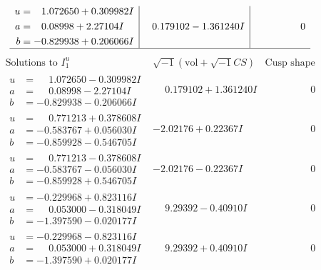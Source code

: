 \documentclass[1p]{elsarticle_modified}
\theoremstyle{definition}
\newcommand{\I}{\sqrt{-1}}
\begin{document}
$$\begin{array}{c|c|c}
\begin{aligned}
u &= \phantom{-}1.072650 + 0.309982 I \\
a &= \phantom{-}0.08998 + 2.27104 I \\
b &= -0.829938 + 0.206066 I\end{aligned}
 & \phantom{-}0.179102 - 1.361240 I & \phantom{-0.000000 } 0\\
 \hline 
 \end{array}$$\newpage$$\begin{array}{c|c|c}  
\text{Solutions to }I^u_{1}& \I (\text{vol} + \sqrt{-1}CS) & \text{Cusp shape}\\
 \hline 
\begin{aligned}
u &= \phantom{-}1.072650 - 0.309982 I \\
a &= \phantom{-}0.08998 - 2.27104 I \\
b &= -0.829938 - 0.206066 I\end{aligned}
 & \phantom{-}0.179102 + 1.361240 I & \phantom{-0.000000 } 0 \\ \hline\begin{aligned}
u &= \phantom{-}0.771213 + 0.378608 I \\
a &= -0.583767 + 0.056030 I \\
b &= -0.859928 - 0.546705 I\end{aligned}
 & -2.02176 + 0.22367 I & \phantom{-0.000000 } 0 \\ \hline\begin{aligned}
u &= \phantom{-}0.771213 - 0.378608 I \\
a &= -0.583767 - 0.056030 I \\
b &= -0.859928 + 0.546705 I\end{aligned}
 & -2.02176 - 0.22367 I & \phantom{-0.000000 } 0 \\ \hline\begin{aligned}
u &= -0.229968 + 0.823116 I \\
a &= \phantom{-}0.053000 - 0.318049 I \\
b &= -1.397590 - 0.020177 I\end{aligned}
 & \phantom{-}9.29392 - 0.40910 I & \phantom{-0.000000 } 0 \\ \hline\begin{aligned}
u &= -0.229968 - 0.823116 I \\
a &= \phantom{-}0.053000 + 0.318049 I \\
b &= -1.397590 + 0.020177 I\end{aligned}
 & \phantom{-}9.29392 + 0.40910 I & \phantom{-0.000000 } 0 \\ \hline\begin{aligned}

\end{aligned}
\end{array}$$
\end{document}
